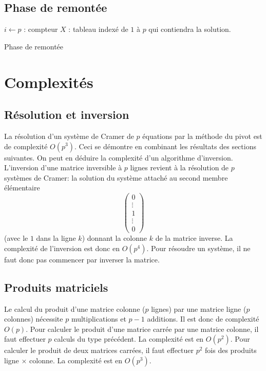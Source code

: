 \subsection{Phase de remontée}
\begin{algorithm}[h]
  $i\leftarrow p$ : compteur\;
  $X$ : tableau indexé de $1$ à $p$ qui contiendra la solution.\;
  \caption{Phase de remontée}
  \label{resolsystlin_3}
\end{algorithm}


\section{Complexités}
\subsection{Résolution et inversion}
La résolution d'un système de Cramer de $p$ équations par la méthode du pivot est de complexité $O(p^3)$.\newline
Ceci se démontre en combinant les résultats des sections suivantes. On peut en déduire la complexité d'un algorithme d'inversion.\newline
L'inversion d'une matrice inversible à $p$ lignes revient à la résolution de $p$ systèmes de Cramer: la solution du système attaché au second membre élémentaire
\begin{displaymath}
\begin{pmatrix}
0 \\ \vdots \\ 1 \\ \vdots \\0   
 \end{pmatrix}
\end{displaymath}
(avec le $1$ dans la ligne $k$) donnant la colonne $k$ de la matrice inverse. La complexité de l'inversion est donc en $O(p^4)$. Pour résoudre un système, il ne faut donc pas commencer par inverser la matrice.
\subsection{Produits matriciels}
Le calcul du produit d'une matrice colonne ($p$ lignes) par une matrice ligne ($p$ colonnes) nécessite $p$ multiplications et $p-1$ additions. Il est donc de complexité $O(p)$.\newline
Pour calculer le produit d'une matrice carrée par une matrice colonne, il faut effectuer $p$ calculs du type précédent. La complexité est en $O(p^2)$.\newline
Pour calculer le produit de deux matrices carrées, il faut effectuer $p^2$ fois des produits ligne $\times$ colonne. La complexité est en $O(p^3)$.
